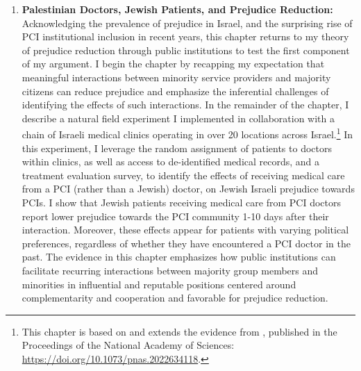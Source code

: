 \documentclass[12pt]{article}
\theoremstyle{plain}
\begin{document}
\begin{enumerate}
\item \textbf{Palestinian Doctors, Jewish Patients, and Prejudice Reduction:} Acknowledging the prevalence of prejudice in Israel, and the surprising rise of PCI institutional inclusion in recent years, this chapter returns to my theory of prejudice reduction through public institutions to test the first component of my argument. I begin the chapter by recapping my expectation that meaningful interactions between minority service providers and majority citizens can reduce prejudice and emphasize the inferential challenges of identifying the effects of such interactions. In the remainder of the chapter, I describe a natural field experiment I implemented in collaboration with a chain of Israeli medical clinics operating in over 20 locations across Israel.\footnote{This chapter is based on and extends the evidence from \citet{Weiss:2021aa}, published in the Proceedings of the National Academy of Sciences: \href{https://doi.org/10.1073/pnas.2022634118}{https://doi.org/10.1073/pnas.2022634118}.} In this experiment, I leverage the random assignment of patients to doctors within clinics, as well as access to de-identified medical records, and a treatment evaluation survey, to identify the effects of receiving medical care from a PCI (rather than a Jewish) doctor, on Jewish Israeli prejudice towards PCIs. I show that Jewish patients receiving medical care from PCI doctors report lower prejudice towards the PCI community 1-10 days after their interaction. Moreover, these effects appear for patients with varying political preferences, regardless of whether they have encountered a PCI doctor in the past. The evidence in this chapter emphasizes how public institutions can facilitate recurring interactions between majority group members and minorities in influential and reputable positions centered around complementarity and cooperation and favorable for prejudice reduction. 



\end{enumerate}
\end{document}
